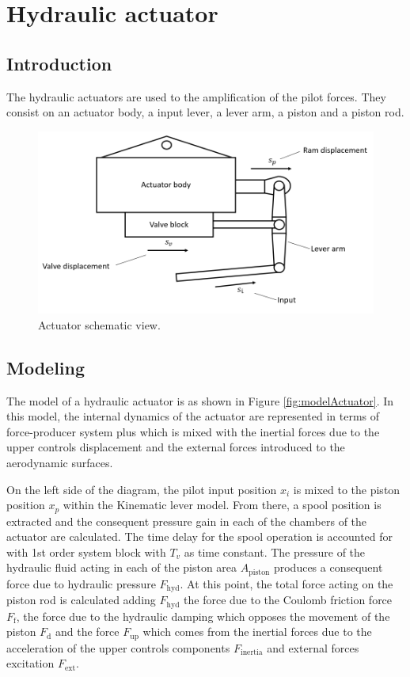 \section{Hydraulic actuator}

\subsection{Introduction}

  The hydraulic actuators are used to the amplification of the pilot forces. They consist on an actuator body, a input lever, a lever arm, a piston and a piston rod. 
  \begin{figure}[!htpb]
    \centering
    \includegraphics[width=0.7 \textwidth]{figures/diagramActuator}
    \caption[Actuator schematic view]{Actuator schematic view.}
    \label{fig:diagramActuator}
  \end{figure}
\subsection{Modeling}

  The model of a hydraulic actuator is as shown in Figure \ref{fig:modelActuator}. In this model, the internal dynamics of the actuator are represented in terms of force-producer system plus which is mixed with the inertial forces due to the upper controls displacement and the external forces introduced to the aerodynamic surfaces.

  On the left side of the diagram, the pilot input position $x_i$ is mixed to the piston position $x_p$ within the Kinematic lever model. From there, a spool position is extracted and the consequent pressure gain in each of the chambers of the actuator are calculated. The time delay for the spool operation is accounted for with 1st order system block with $T_v$ as time constant. The pressure of the hydraulic fluid acting in each of the piston area $A_{\mathrm{piston}}$ produces a consequent force due to hydraulic pressure $F_{\mathrm{hyd}}$. At this point, the total force acting on the piston rod is calculated adding $F_{\mathrm{hyd}}$ the force due to the Coulomb friction force $F_{\mathrm{f}}$, the force due to the hydraulic damping which opposes the movement of the piston $F_{\mathrm{d}}$ and the force $F_{\mathrm{up}}$ which comes from the inertial forces due to the acceleration of the upper controls components $F_{\mathrm{inertia}}$ and external forces excitation $F_{\mathrm{ext}}$. 

